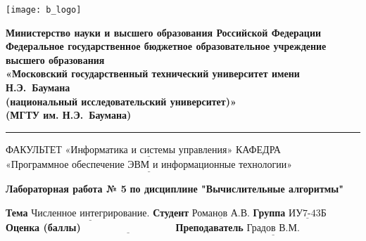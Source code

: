 \documentclass[a4paper,12pt]{article}
\begin{document}
\thispagestyle{empty}

\noindent \begin{minipage}{0.15\textwidth}
	\texttt{[image: b\_logo]}
\end{minipage}
\noindent\begin{minipage}{0.9\textwidth}\centering
	\textbf{Министерство науки и высшего образования Российской Федерации}\\
	\textbf{Федеральное государственное бюджетное образовательное учреждение высшего образования}\\
	\textbf{«Московский государственный технический университет имени Н.Э.~Баумана}\\
	\textbf{(национальный исследовательский университет)»}\\
	\textbf{(МГТУ им. Н.Э.~Баумана)}
\end{minipage}

\noindent\rule{18cm}{3pt}
\newline\newline
\noindent ФАКУЛЬТЕТ $\underline{\text{«Информатика и системы управления»}}$ \newline\newline
\noindent КАФЕДРА $\underline{\text{«Программное обеспечение ЭВМ и информационные технологии»}}$\newline\newline\newline\newline\newline\newline\newline


\begin{center}
	\noindent\begin{minipage}{1.3\textwidth}\centering
	\Large\textbf{  Лабораторная работа № 5}\newline
	\textbf{по дисциплине "Вычислительные алгоритмы"}\newline\newline\newline
	\end{minipage}
\end{center}

\noindent\textbf{Тема} $\underline{\text{Численное интегрирование.}}$\newline\newline
\noindent\textbf{Студент} $\underline{\text{Романов А.В.}}$\newline\newline
\noindent\textbf{Группа} $\underline{\text{ИУ7-43Б}}$\newline\newline
\noindent\textbf{Оценка (баллы)} $\underline{\text{~~~~~~~~~~~~~~~~~~~~~~~~~~~}}$\newline\newline
\noindent\textbf{Преподаватель} $\underline{\text{Градов В.М.}}$\newline
\end{document}
